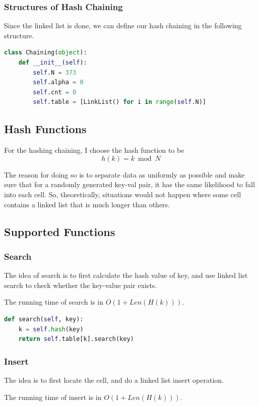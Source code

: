 \documentclass{article}
\begin{document}
\begin{spacing}{1.2}
\subsubsection{Structures of Hash Chaining}
Since the linked list is done, we can define our hash chaining in the following structure.
\begin{lstlisting}[language=Python]
class Chaining(object):
    def __init__(self):
        self.N = 373
        self.alpha = 0
        self.cnt = 0
        self.table = [LinkList() for i in range(self.N)]
\end{lstlisting}

\subsection{Hash Functions}
For the hashing chaining, I choose the hash function to be 
\begin{equation*}
    h(k) = k \bmod N
\end{equation*}

The reason for doing so is to separate data as uniformly as possible and make sure that for a randomly generated key-val pair, it has the same likelihood to fall into each cell. So, theoretically, situations would not happen where some cell contains a linked list that is much longer than others.

\subsection{Supported Functions}
\subsubsection{Search}
The idea of search is to first calculate the hash value of key, and use linked list search to check whether the key-value pair exists.

The running time of search is in $O(1 + Len(H(k)))$.
\begin{lstlisting}[language=Python]
def search(self, key):
    k = self.hash(key)
    return self.table[k].search(key)
\end{lstlisting}

\subsubsection{Insert}
The idea is to first locate the cell, and do a linked list insert operation.

The running time of insert is in $O(1 + Len(H(k)))$.


\end{spacing}
\end{document}
